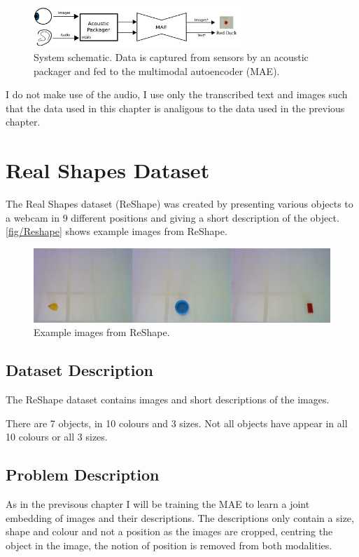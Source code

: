 \begin{figure}[h]
    \centering
    \includegraphics[width=0.7\textwidth]{Figs/chapter6/bimodal_system_schematic.png}
    \caption{System schematic. Data is captured from sensors by an acoustic packager and fed to the multimodal autoencoder (MAE).}
    \label{fig:schematic}
\end{figure}

I do not make use of the audio, I use only the transcribed text and images such that the data used in this chapter is analigous to the data used in the previous chapter.

\section{Real Shapes Dataset}
The Real Shapes dataset (ReShape) was created by presenting various objects to a webcam in 9 different positions and giving a short description of the object. \autoref{fig/Reshape} shows example images from ReShape.

\begin{figure}[h]
    \centering
    \includegraphics[width=\textwidth]{Figs/chapter6/ReShapeExs.png}
    \caption{Example images from ReShape.}
    \label{fig:ReShape}
\end{figure}


\subsection{Dataset Description}
The ReShape dataset contains images and short descriptions of the images.

There are 7 objects, in 10 colours and 3 sizes. Not all objects have appear in all 10 colours or all 3 sizes.


\subsection{Problem Description}
As in the previsous chapter I will be training the MAE to learn a joint embedding of images and their descriptions. The descriptions only contain a size, shape and colour and not a position as the images are cropped, centring the object in the image, the notion of position is removed from both modalities.

